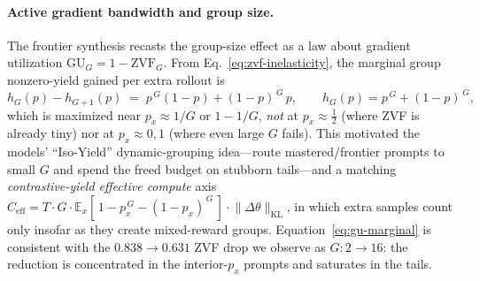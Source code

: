 \paragraph{Active gradient bandwidth and group size.}
The frontier synthesis recasts the group-size effect as a law about
gradient utilization $\mathrm{GU}_G=1-\mathrm{ZVF}_G$. From
Eq.~\eqref{eq:zvf-inelasticity}, the marginal group nonzero-yield gained
per extra rollout is
\begin{equation}
  h_G(p)-h_{G+1}(p) \;=\; p^{\,G}(1-p) + (1-p)^{\,G}\,p,
  \qquad h_G(p)=p^{\,G}+(1-p)^{\,G},
  \label{eq:gu-marginal}
\end{equation}
which is maximized near $p_x\approx 1/G$ or $1-1/G$, \emph{not} at
$p_x\approx\tfrac12$ (where ZVF is already tiny) nor at $p_x\approx 0,1$
(where even large $G$ fails). This motivated the models' ``Iso-Yield''
dynamic-grouping idea---route mastered/frontier prompts to small $G$ and
spend the freed budget on stubborn tails---and a matching
\emph{contrastive-yield effective compute} axis
$C_{\mathrm{eff}} = T\cdot G\cdot \mathbb{E}_x[\,1-p_x^{\,G}-(1-p_x)^{\,G}\,]\cdot\lVert\Delta\theta\rVert_{\mathrm{KL}}$,
in which extra samples count only insofar as they create mixed-reward
groups. Equation~\eqref{eq:gu-marginal} is consistent with the
$0.838\to0.631$ ZVF drop we observe as $G:2\to16$: the reduction is
concentrated in the interior-$p_x$ prompts and saturates in the tails.

